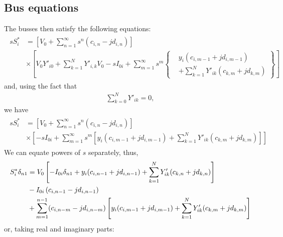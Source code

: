 \documentclass[11pt]{article}
\begin{document}
\subsection{Bus equations}
The busses then satisfy the following equations:
\begin{align}
\begin{split}
	sS^*_i &= \left[V_0 + \sum_{n=1}^{\infty}s^n (c_{i,n} - j d_{i,n})\right] \\
	&\times \left[
		V_0Y'_{i0} + \sum_{k=1}^N Y'_{i,k}V_0 -sI_{0i}+ \sum_{m = 1}^{\infty}s^m \left\{
			\begin{aligned}
				&
				y_i (c_{i,m-1} + jd_{i,m-1}) \\
				&+ \sum_{k=1}^NY'_{ik}(c_{k,m} + jd_{k,m})
			\end{aligned}
		\right\}
	\right]
\end{split}
\end{align}
and, using the fact that
\begin{align}
	\sum_{k=0}^N{Y'_{ik}} = 0,
\end{align}
we have
\begin{align}
\begin{split}
	sS^*_i &= \left[V_0 + \sum_{n=1}^{\infty}s^n (c_{i,n} - j d_{i,n})\right] \\
	&\times \left[
		-sI_{0i} + \sum_{m = 1}^{\infty}s^m \left[
			y_i (c_{i,m-1} + jd_{i,m-1}) + \sum_{k=1}^NY'_{ik}(c_{k,m} + jd_{k,m})
		\right]
		\right]
\end{split}
\label{EQ_MISC1}
\end{align}
We can equate powers of $s$ separately, thus,
\begin{align}
	S^*_i\delta_{n1} &=
			V_0\left[-I_{0i}\delta_{n1} + y_i(c_{i,n-1} + j d_{i,n-1})+ \sum_{k=1}^NY'_{ik}(c_{k,n} + jd_{k,n})\right] \notag \\
			&-I_{0i}\left(c_{i,n-1}-jd_{i,n-1}\right) \notag \\
			&+ \sum_{m=1}^{n-1}(c_{i,n-m}-jd_{i,n-m})
			\left[
				y_i(c_{i,m-1} + jd_{i,m-1})+ \sum_{k=1}^NY'_{ik}(c_{k,m} + jd_{k,m}) 
			\right]
\end{align}
or, taking real and imaginary parts:
\end{document}
